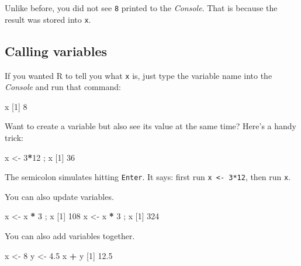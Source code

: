 \documentclass[
]{book}
\newenvironment{Shaded}{\begin{snugshade}}{\end{snugshade}}
\newcommand{\DecValTok}[1]{\textcolor[rgb]{0.00,0.00,0.81}{#1}}
\newcommand{\FloatTok}[1]{\textcolor[rgb]{0.00,0.00,0.81}{#1}}
\newcommand{\NormalTok}[1]{#1}
\newcommand{\OperatorTok}[1]{\textcolor[rgb]{0.81,0.36,0.00}{\textbf{#1}}}
\newcommand{\StringTok}[1]{\textcolor[rgb]{0.31,0.60,0.02}{#1}}
\begin{document}
Unlike before, you did not see \texttt{8} printed to the \emph{Console}. That is because the result was stored into \texttt{x}.

\hypertarget{calling-variables}{%
\subsection*{Calling variables}\label{calling-variables}}

If you wanted R to tell you what \texttt{x} is, just type the variable name into the \emph{Console} and run that command:

\begin{Shaded}
\begin{Highlighting}[]
\NormalTok{x}
\NormalTok{[}\DecValTok{1}\NormalTok{] }\DecValTok{8}
\end{Highlighting}
\end{Shaded}

Want to create a variable but also see its value at the same time? Here's a handy trick:

\begin{Shaded}
\begin{Highlighting}[]
\NormalTok{x <-}\StringTok{ }\DecValTok{3}\OperatorTok{*}\DecValTok{12}\NormalTok{ ; x}
\NormalTok{[}\DecValTok{1}\NormalTok{] }\DecValTok{36}
\end{Highlighting}
\end{Shaded}

The semicolon simulates hitting \texttt{Enter}. It says: first run \texttt{x\ \textless{}-\ 3*12}, then run \texttt{x}.

You can also update variables.

\begin{Shaded}
\begin{Highlighting}[]
\NormalTok{x <-}\StringTok{ }\NormalTok{x }\OperatorTok{*}\StringTok{ }\DecValTok{3}\NormalTok{ ; x}
\NormalTok{[}\DecValTok{1}\NormalTok{] }\DecValTok{108}
\NormalTok{x <-}\StringTok{ }\NormalTok{x }\OperatorTok{*}\StringTok{ }\DecValTok{3}\NormalTok{ ; x}
\NormalTok{[}\DecValTok{1}\NormalTok{] }\DecValTok{324}
\end{Highlighting}
\end{Shaded}

You can also add variables together.

\begin{Shaded}
\begin{Highlighting}[]
\NormalTok{x <-}\StringTok{ }\DecValTok{8}
\NormalTok{y <-}\StringTok{ }\FloatTok{4.5}
\NormalTok{x }\OperatorTok{+}\StringTok{ }\NormalTok{y}
\NormalTok{[}\DecValTok{1}\NormalTok{] }\FloatTok{12.5}
\end{Highlighting}
\end{Shaded}
\end{document}
